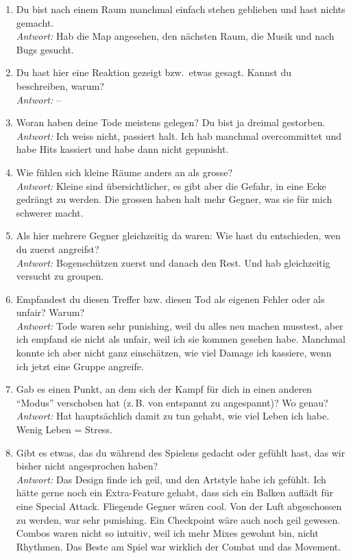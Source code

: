 \documentclass[../Main.tex]{subfiles}
\begin{document}
\begin{enumerate}[label=\textbf{I\arabic*}, leftmargin=1.5cm, itemsep=1em]
\item Du bist nach einem Raum manchmal einfach stehen geblieben und hast nichts gemacht. \\
\textit{Antwort:} Hab die Map angesehen, den nächsten Raum, die Musik und nach Bugs gesucht.

\item Du hast hier eine Reaktion gezeigt bzw.\ etwas gesagt. Kannst du beschreiben, warum? \\
\textit{Antwort:} --

\item Woran haben deine Tode meistens gelegen? Du bist ja dreimal gestorben. \\
\textit{Antwort:} Ich weiss nicht, passiert halt. Ich hab manchmal overcommittet und habe Hits kassiert und habe dann nicht gepunisht.

\item Wie fühlen sich kleine Räume anders an als grosse? \\
\textit{Antwort:} Kleine sind übersichtlicher, es gibt aber die Gefahr, in eine Ecke gedrängt zu werden. Die grossen haben halt mehr Gegner, was sie für mich schwerer macht.

\item Als hier mehrere Gegner gleichzeitig da waren: Wie hast du entschieden, wen du zuerst angreifst? \\
\textit{Antwort:} Bogenschützen zuerst und danach den Rest. Und hab gleichzeitig versucht zu groupen.

\item Empfandest du diesen Treffer bzw. diesen Tod als eigenen Fehler oder als unfair? Warum? \\
\textit{Antwort:} Tode waren sehr punishing, weil du alles neu machen musstest, aber ich empfand sie nicht als unfair, weil ich sie kommen gesehen habe. Manchmal konnte ich aber nicht ganz einschätzen, wie viel Damage ich kassiere, wenn ich jetzt eine Gruppe angreife.

\item Gab es einen Punkt, an dem sich der Kampf für dich in einen anderen \enquote{Modus} verschoben hat (z.\,B. von entspannt zu angespannt)? Wo genau? \\
\textit{Antwort:} Hat hauptsächlich damit zu tun gehabt, wie viel Leben ich habe. Wenig Leben = Stress.

\item Gibt es etwas, das du während des Spielens gedacht oder gefühlt hast, das wir bisher nicht angesprochen haben? \\
\textit{Antwort:} Das Design finde ich geil, und den Artstyle habe ich gefühlt. Ich hätte gerne noch ein Extra-Feature gehabt, dass sich ein Balken auflädt für eine Special Attack. Fliegende Gegner wären cool. Von der Luft abgeschossen zu werden, war sehr punishing. Ein Checkpoint wäre auch noch geil gewesen. Combos waren nicht so intuitiv, weil ich mehr Mixes gewohnt bin, nicht Rhythmen. Das Beste am Spiel war wirklich der Combat und das Movement.
\end{enumerate}
\end{document}
